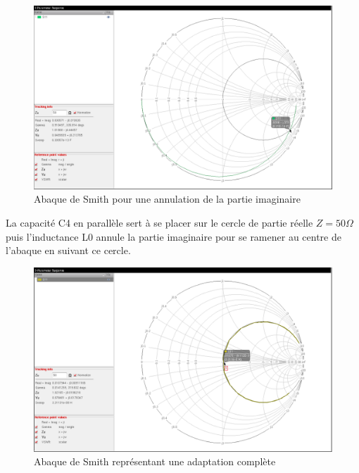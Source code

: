 \documentclass[a4paper]{article}
\begin{document}
\begin{figure}[!htb]
\begin{center}
  \includegraphics[width=\linewidth]{smith-capa-parallele-1st-adapt.png}
  \caption{Abaque de Smith pour une annulation de la partie imaginaire}
\end{center}
\end{figure}

La capacit\'e C4 en parall\`ele sert \`a se placer sur le cercle de partie r\'eelle $Z=50 \Omega$ puis l'inductance L0
annule la partie imaginaire pour se ramener au centre de l'abaque en suivant ce cercle.

\clearpage

\begin{figure}[!htb]
\begin{center}
  \includegraphics[width=\linewidth]{smith-induct-series-1st-adapt.png}
  \caption{Abaque de Smith repr\'esentant une adaptation compl\`ete}
\end{center}
\end{figure}
\end{document}
